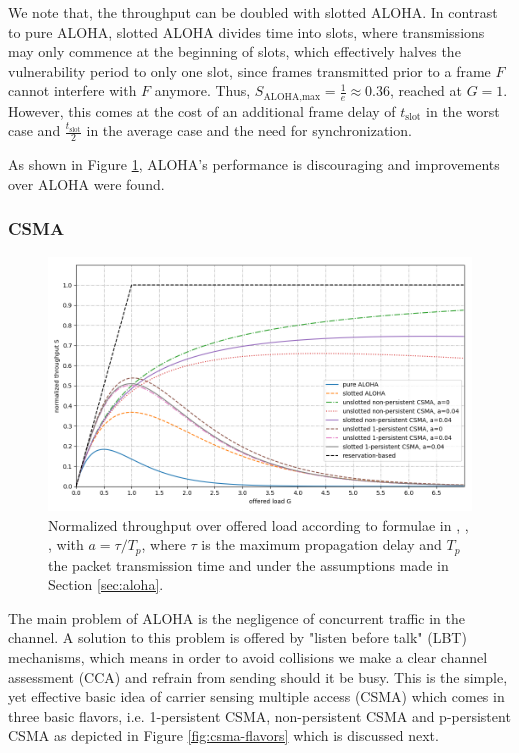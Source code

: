 We note that, the throughput can be doubled with slotted ALOHA. In contrast to pure ALOHA, slotted ALOHA divides time into slots, where transmissions may only commence at the beginning of slots, which effectively halves the vulnerability period to only one slot, since frames transmitted prior to a frame $F$ cannot interfere with $F$ anymore. Thus, $S_\text{ALOHA,max} = \frac{1}{e} \approx 0.36$, reached at $G=1$. However, this comes at the cost of an additional frame delay of $t_\text{slot}$ in the worst case and $\frac{t_\text{slot}}{2}$ in the average case and the need for synchronization. 

As shown in Figure \ref{fig:aloha-csma-performance}, ALOHA's performance is discouraging and improvements over ALOHA were found. 

\subsubsection{CSMA}
\label{sec:csma}

\begin{figure}[tb]
	\label{fig:aloha-csma-performance}
	\begin{center}
		\includegraphics[width=\textwidth]{pictures/aloha_csma_performance}
	\end{center}
	\caption[Normalized throughput over offerered load for various ALOHA and CSMA variants.]{Normalized throughput over offered load according to formulae in \cite{Tanenbaum02}, \cite{Garg07}, \cite{Bachir10}, with $a=\tau/T_p$, where $\tau$ is the maximum propagation delay and $T_p$ the packet transmission time and under the assumptions made in Section \ref{sec:aloha}. }
\end{figure}

The main problem of ALOHA is the negligence of concurrent traffic in the channel. A solution to this problem is offered by "listen before talk" (LBT) mechanisms, which means in order to avoid collisions we make a clear channel assessment (CCA) and refrain from sending should it be busy. This is the simple, yet effective basic idea of carrier sensing multiple access (CSMA) which comes in three basic flavors, i.e. 1-persistent CSMA, non-persistent CSMA and p-persistent CSMA as depicted in Figure \ref{fig:csma-flavors} which is discussed next.

